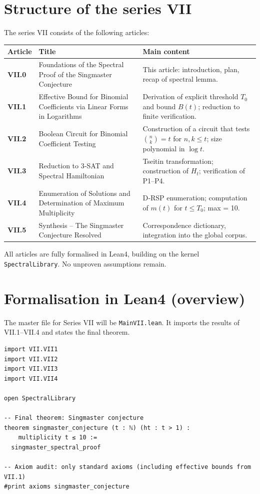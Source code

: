 \documentclass[11pt,a4paper]{article}
\begin{document}
\section{Structure of the series VII}

The series VII consists of the following articles:

\begin{center}
\small
\begin{tabular}{@{}>{\bfseries}l>{\raggedright\arraybackslash}p{4.5cm}>{\raggedright\arraybackslash}p{6cm}@{}}
\toprule
\textbf{Article} & \textbf{Title} & \textbf{Main content} \\
\midrule
VII.0 & Foundations of the Spectral Proof of the Singmaster Conjecture & This article: introduction, plan, recap of spectral lemma. \\
VII.1 & Effective Bound for Binomial Coefficients via Linear Forms in Logarithms & Derivation of explicit threshold \(T_0\) and bound \(B(t)\); reduction to finite verification. \\
VII.2 & Boolean Circuit for Binomial Coefficient Testing & Construction of a circuit that tests \(\binom{n}{k}=t\) for \(n,k\le t\); size polynomial in \(\log t\). \\
VII.3 & Reduction to 3‑SAT and Spectral Hamiltonian & Tseitin transformation; construction of \(H_t\); verification of P1–P4. \\
VII.4 & Enumeration of Solutions and Determination of Maximum Multiplicity & D‑RSP enumeration; computation of \(m(t)\) for \(t\le T_0\); max = 10. \\
VII.5 & Synthesis – The Singmaster Conjecture Resolved & Correspondence dictionary, integration into the global corpus. \\
\bottomrule
\end{tabular}
\normalsize
\end{center}

All articles are fully formalised in Lean4, building on the kernel \texttt{SpectralLibrary}. No unproven assumptions remain.

\section{Formalisation in Lean4 (overview)}

The master file for Series VII will be \texttt{MainVII.lean}. It imports the results of VII.1–VII.4 and states the final theorem.

\begin{lstlisting}[style=lean, caption={MainVII.lean (final)}]
import VII.VII1
import VII.VII2
import VII.VII3
import VII.VII4

open SpectralLibrary

-- Final theorem: Singmaster conjecture
theorem singmaster_conjecture (t : ℕ) (ht : t > 1) :
    multiplicity t ≤ 10 :=
  singmaster_spectral_proof

-- Axiom audit: only standard axioms (including effective bounds from VII.1)
#print axioms singmaster_conjecture
\end{lstlisting}
\end{document}
